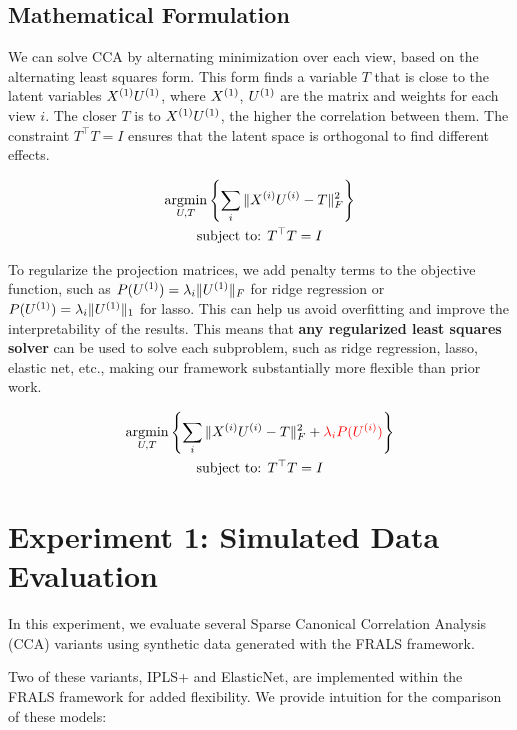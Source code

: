 \subsection{Mathematical Formulation}
We can solve CCA by alternating minimization over each view, based on the alternating least squares form.
This form finds a variable \( T \) that is close to the latent variables \( X^{(1)} U^{(1)} \), where \( X^{(1)} \), \( U^{(1)} \) are the matrix and weights for each view \( i \).
The closer \( T \) is to \( X^{(1)} U^{(1)} \), the higher the correlation between them.
The constraint \( T^\top T = I \) ensures that the latent space is orthogonal to find different effects.

\begin{gather*}
    \underset{U, T}{\mathrm{argmin}}\left\{\sum_i \|X^{(i)} U^{(i)} - T\|_F^2 \right\}\\
    \text{subject to: } T^\top T = I\\
\end{gather*}

To regularize the projection matrices, we add penalty terms to the objective function, such as \( P(U^{(1)}) = \lambda_i \|U^{(1)}\|_F \) for ridge regression or \( P(U^{(1)}) = \lambda_i \|U^{(1)}\|_1 \) for lasso.
This can help us avoid overfitting and improve the interpretability of the results.
This means that \textbf{any regularized least squares solver} can be used to solve each subproblem, such as ridge regression, lasso, elastic net, etc., making our framework substantially more flexible than prior work.

\begin{gather*}
    \underset{U, T}{\mathrm{argmin}}\left\{\sum_i \|X^{(i)} U^{(i)} - T\|_F^2 + \textcolor{red}{\lambda_i P(U^{(i)})}\right\}\\
    \text{subject to: } T^\top T = I\\
\end{gather*}


\section{Experiment 1: Simulated Data Evaluation}\label{subsec:exp1}

In this experiment, we evaluate several Sparse Canonical Correlation Analysis (CCA) variants using synthetic data generated with the FRALS framework.

Two of these variants, IPLS+ and ElasticNet, are implemented within the FRALS framework for added flexibility.
We provide intuition for the comparison of these models:

